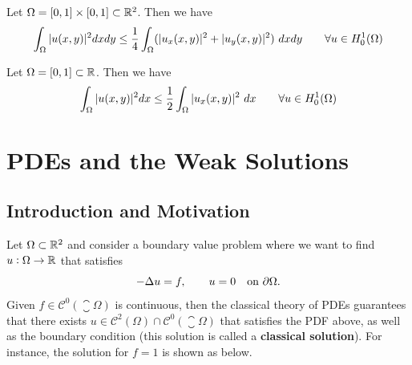 \begin{example}
	Let $ \Omega = [0,1]\times [0,1] \subset \mathbb{R}^2$. Then we have
	\[ \int_\Omega|u(x,y)|^2 dxdy \leq \frac{1}{4} \int_\Omega (|u_x(x,y)|^2 + |u_y(x,y)|^2)\ dxdy \qquad \forall u \in H_0^1(\Omega) \]
\end{example}

\begin{example}
	Let $ \Omega = [0,1] \subset \mathbb{R} $. Then we have
	\[ \int_\Omega|u(x,y)|^2 dx \leq \frac{1}{2} \int_\Omega |u_x(x,y)|^2 \ dx \qquad \forall u \in H_0^1(\Omega) \]
\end{example}





\section{PDEs and the Weak Solutions}

\subsection{Introduction and Motivation}
Let $ \Omega \subset \mathbb{R}^2 $ and consider a boundary value problem where we want to find $ u: \Omega \to \mathbb{R} $ that satisfies
\[ -\Delta u = f, \qquad u = 0 \quad \text{on $ \partial \Omega $}. \]
Given $ f \in \mathscr{C}^0(\closure{\Omega})$ is continuous, then the classical theory of PDEs guarantees that there exists $ u \in \mathscr{C}^2(\Omega) \cap \mathscr{C}^0(\closure{\Omega}) $ that satisfies the PDF above, as well as the boundary condition (this solution is called a \textbf{classical solution}). For instance, the solution for $ f=1 $ is shown as below.


